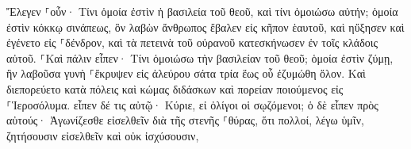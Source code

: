 \documentclass{openreader}
\begin{document}
Ἔλεγεν ⸀οὖν· Τίνι ὁμοία ἐστὶν ἡ βασιλεία τοῦ θεοῦ, καὶ τίνι ὁμοιώσω αὐτήν; 
ὁμοία ἐστὶν κόκκῳ σινάπεως, ὃν λαβὼν ἄνθρωπος ἔβαλεν εἰς κῆπον ἑαυτοῦ, καὶ ηὔξησεν καὶ ἐγένετο εἰς ⸀δένδρον, καὶ τὰ πετεινὰ τοῦ οὐρανοῦ κατεσκήνωσεν ἐν τοῖς κλάδοις αὐτοῦ. 
⸀Καὶ πάλιν εἶπεν· Τίνι ὁμοιώσω τὴν βασιλείαν τοῦ θεοῦ; 
ὁμοία ἐστὶν ζύμῃ, ἣν λαβοῦσα γυνὴ ⸀ἔκρυψεν εἰς ἀλεύρου σάτα τρία ἕως οὗ ἐζυμώθη ὅλον. 
Καὶ διεπορεύετο κατὰ πόλεις καὶ κώμας διδάσκων καὶ πορείαν ποιούμενος εἰς ⸀Ἱεροσόλυμα. 
εἶπεν δέ τις αὐτῷ· Κύριε, εἰ ὀλίγοι οἱ σῳζόμενοι; ὁ δὲ εἶπεν πρὸς αὐτούς· 
Ἀγωνίζεσθε εἰσελθεῖν διὰ τῆς στενῆς ⸀θύρας, ὅτι πολλοί, λέγω ὑμῖν, ζητήσουσιν εἰσελθεῖν καὶ οὐκ ἰσχύσουσιν, 
\end{document}
